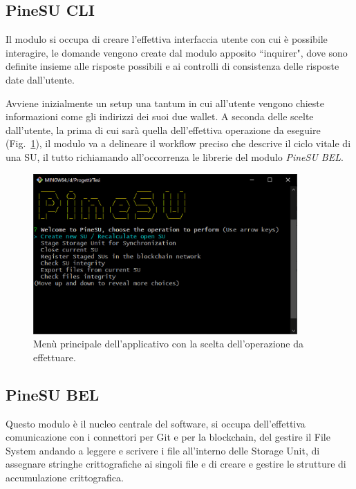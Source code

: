 \subsection{PineSU CLI}

Il modulo si occupa di creare l'effettiva interfaccia utente con cui è possibile interagire,
le domande vengono create dal modulo apposito ``inquirer", dove sono definite
insieme alle risposte possibili e ai controlli di consistenza delle risposte date dall'utente.

Avviene inizialmente un setup una tantum in cui all'utente vengono chieste informazioni come gli indirizzi dei
suoi due wallet. A seconda delle scelte dall'utente, la prima di cui sarà quella dell'effettiva
operazione da eseguire (Fig.~\ref{fi:menu}), il modulo va a delineare il workflow preciso che descrive il ciclo vitale
di una SU, il tutto richiamando all'occorrenza le librerie del modulo \emph{PineSU BEL}. 

\begin{figure}[H]
    \centering
    \includegraphics[width=0.9\textwidth]{Figures/menu}
    \caption{\small{
    Menù principale dell'applicativo con la scelta dell'operazione da effettuare.
    } %
    } %
    \label{fi:menu}
\end{figure}


\subsection{PineSU BEL}

Questo modulo è il nucleo centrale del software, si occupa dell'effettiva comunicazione con i connettori per
Git e per la blockchain, del gestire il File System andando a leggere e scrivere i file all'interno delle
Storage Unit, di assegnare stringhe crittografiche ai singoli file e di creare e gestire le strutture
di accumulazione crittografica.

